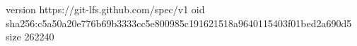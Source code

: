 version https://git-lfs.github.com/spec/v1
oid sha256:c5a50a20e776b69b3333cc5e800985c191621518a9640115403f01bed2a690d5
size 262240
